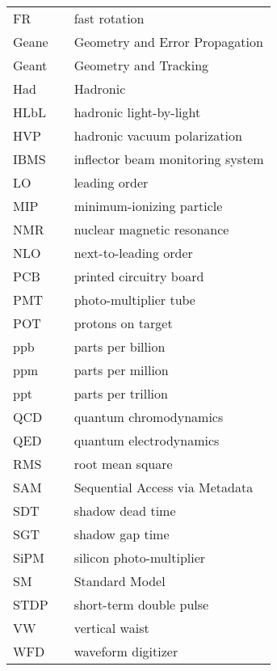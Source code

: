 {\begin{center}
\begin{longtable}{lll}
    FR & \dotfill & fast rotation \\
    Geane & \dotfill & Geometry and Error Propagation \\
    Geant & \dotfill & Geometry and Tracking \\
    Had & \dotfill & Hadronic \\
    HLbL & \dotfill & hadronic light-by-light \\
    HVP & \dotfill & hadronic vacuum polarization \\
    IBMS & \dotfill & inflector beam monitoring system \\
    LO & \dotfill & leading order \\
    MIP & \dotfill & minimum-ionizing particle \\
    NMR & \dotfill & nuclear magnetic resonance \\
    NLO & \dotfill & next-to-leading order \\
    PCB & \dotfill & printed circuitry board \\
    PMT  & \dotfill & photo-multiplier tube \\
    POT & \dotfill & protons on target \\
    ppb & \dotfill & parts per billion \\
    ppm & \dotfill & parts per million \\
    ppt & \dotfill & parts per trillion \\
    QCD & \dotfill & quantum chromodynamics \\
    QED & \dotfill & quantum electrodynamics \\
    RMS & \dotfill & root mean square \\
    SAM & \dotfill & Sequential Access via Metadata \\
    SDT & \dotfill & shadow dead time \\
    SGT & \dotfill & shadow gap time \\
    SiPM & \dotfill & silicon photo-multiplier \\
    SM & \dotfill & Standard Model \\
    STDP & \dotfill & short-term double pulse \\
    VW & \dotfill & vertical waist \\
    WFD & \dotfill & waveform digitizer \\
  \end{longtable}
\end{center}
\cleardoublepage

} %


\newpage
\endofprelim
